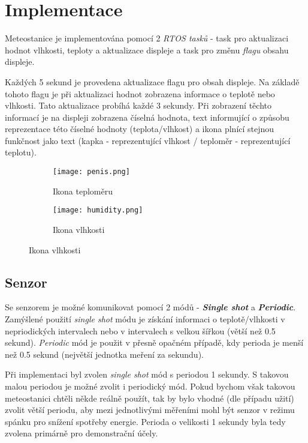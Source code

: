 \section{Implementace}
Meteostanice je implementována pomocí 2 \textit{RTOS tasků} -
task pro aktualizaci hodnot vlhkosti, teploty a aktualizace displeje
a task pro změnu \textit{flagu} obsahu displeje.

Každých 5 sekund je provedena aktualizace flagu pro obsah displeje.
Na základě tohoto flagu je při aktualizaci hodnot zobrazena informace
o teplotě nebo vlhkosti. Tato aktualizace probíhá každé 3 sekundy.
Při zobrazení těchto informací je na displeji zobrazena číselná hodnota,
text informující o způsobu reprezentace
této číselné hodnoty (teplota/vlhkost) a ikona plnící stejnou funkčnost
jako text (kapka - reprezentující vlhkost / teploměr - reprezentující teplotu).

\begin{figure}[h]
	\centering
	\begin{subfigure}[h!]{0.4\textwidth}
		\centering
		\texttt{[image: penis.png]}
		\caption{Ikona teploměru}
	\end{subfigure}
	\hfill
	\begin{subfigure}[h!]{0.4\textwidth}
		\centering
		\texttt{[image: humidity.png]}
		\caption{Ikona vlhkosti}
	\end{subfigure}
\end{figure}

\subsection{Senzor}
Se senzorem je možné komunikovat pomocí 2 módů
- \textbf{\textit{Single shot}} a \textbf{\textit{Periodic}}.
Zamýšlené použití \textit{single shot} módu je získání
informaci o teplotě/vlhkosti v nepriodických intervalech
nebo v intervalech s velkou šířkou (větší než 0.5 sekund). \textit{Periodic} mód
je použit v přesně opačném případě, kdy perioda je menší než 0.5 sekund
(největší jednotka meření za sekundu).

Při implementaci byl zvolen \textit{single shot} mód s periodou 1 sekundy.
S takovou malou periodou je možné zvolit i periodický mód.
Pokud bychom však takovou meteostanici chtěli někde reálně použít,
tak by bylo vhodné (dle případu užití) zvolit větší periodu,
aby mezi jednotlivými měřeními mohl být senzor v režimu spánku
pro snížení spotřeby energie. Perioda o velikosti 1 sekundy byla
tedy zvolena primárně pro demonstrační účely.

